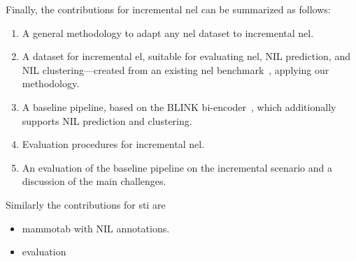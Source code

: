 Finally, the contributions for incremental \ac{nel} can be summarized as follows:
\begin{enumerate}
    \item A general methodology to adapt any \ac{nel} dataset to incremental \ac{nel}.
    \item A dataset for incremental \ac{el}, suitable for evaluating \ac{nel}, NIL prediction, and NIL clustering---created from an existing \ac{nel} benchmark~\cite{Onoe_Durrett_2020}, applying our methodology.
    \item A baseline pipeline, based on the BLINK bi-encoder~\cite{blink}, which additionally supports NIL prediction and clustering.
    \item Evaluation procedures for incremental \ac{nel}.
    \item An evaluation of the baseline pipeline on the incremental scenario and a discussion of the main challenges.
\end{enumerate}
Similarly the contributions for \ac{sti} are
\begin{itemize}
    \item mammotab with NIL annotations.
    \item evaluation\todo{}
\end{itemize}